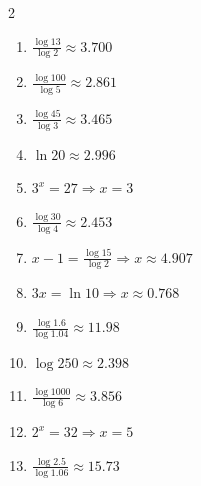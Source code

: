 \documentclass[11pt]{article}
\begin{document}
\begin{keybox}
\begin{multicols}{2}
\small
\begin{enumerate}[leftmargin=*,itemsep=3pt]
  \item $\tfrac{\log 13}{\log 2}\approx3.700$
  \item $\tfrac{\log 100}{\log 5}\approx2.861$
  \item $\tfrac{\log 45}{\log 3}\approx3.465$
  \item $\ln 20\approx2.996$
  \item $3^x=27\Rightarrow x=3$
  \item $\tfrac{\log 30}{\log 4}\approx2.453$
  \item $x-1=\tfrac{\log 15}{\log 2}\Rightarrow x\approx4.907$
  \item $3x=\ln 10\Rightarrow x\approx0.768$
  \item $\tfrac{\log 1.6}{\log 1.04}\approx11.98$
  \item $\log 250\approx2.398$
  \item $\tfrac{\log 1000}{\log 6}\approx3.856$
  \item $2^x=32\Rightarrow x=5$
  \item $\tfrac{\log 2.5}{\log 1.06}\approx15.73$
\end{enumerate}
\end{multicols}
\end{keybox}
\end{document}

